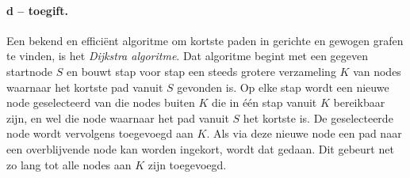 \documentclass[11pt]{article}
\begin{document}
\paragraph{d -- toegift.}
Een bekend en effici\"ent algoritme om kortste paden in gerichte en gewogen
grafen te vinden, is het {\em Dijkstra algoritme\/}.
Dat algoritme begint met een gegeven startnode $S$ en bouwt stap voor stap een
steeds grotere verzameling $K$ van nodes waarnaar het kortste pad vanuit $S$
gevonden is.
Op elke stap wordt een nieuwe node geselecteerd van die nodes buiten $K$ die in
\'e\'en stap vanuit $K$ bereikbaar zijn, en wel die node waarnaar het pad
vanuit $S$ het kortste is.
De geselecteerde node wordt vervolgens toegevoegd aan $K$.
Als via deze nieuwe node een pad naar een overblijvende node kan worden
ingekort, wordt dat gedaan.
Dit gebeurt net zo lang tot alle nodes aan $K$ zijn toegevoegd.
\end{document}
